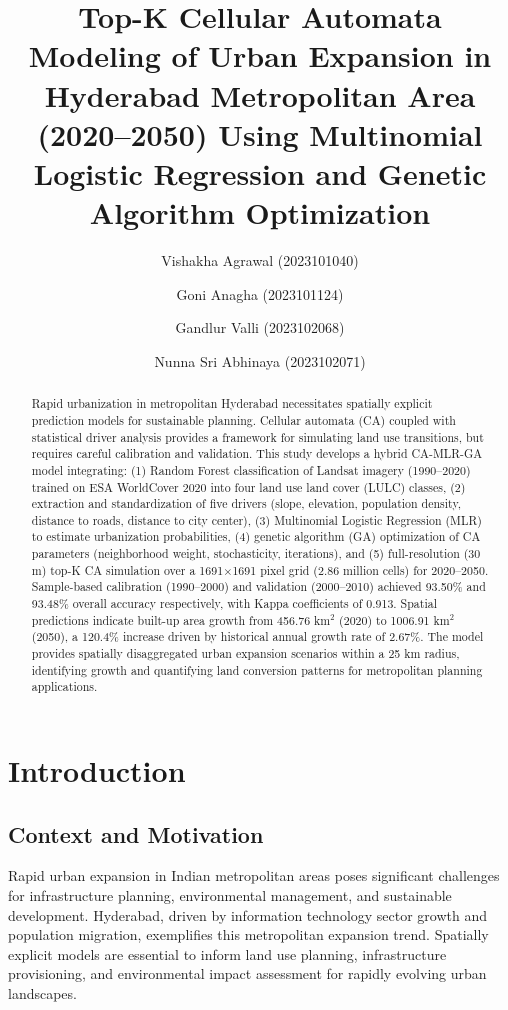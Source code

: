 \documentclass[12pt,a4paper]{article}
\begin{document}
\title{Top-K Cellular Automata Modeling of Urban Expansion in Hyderabad Metropolitan Area (2020--2050) Using Multinomial Logistic Regression and Genetic Algorithm Optimization}

\author{
Vishakha Agrawal (2023101040) \and
Goni Anagha (2023101124) \and
Gandlur Valli (2023102068) \and
Nunna Sri Abhinaya (2023102071)
}
\date{}

\maketitle

\begin{abstract}
Rapid urbanization in metropolitan Hyderabad necessitates spatially explicit prediction models for sustainable planning. Cellular automata (CA) coupled with statistical driver analysis provides a framework for simulating land use transitions, but requires careful calibration and validation. This study develops a hybrid CA-MLR-GA model integrating: (1) Random Forest classification of Landsat imagery (1990--2020) trained on ESA WorldCover 2020 into four land use land cover (LULC) classes, (2) extraction and standardization of five drivers (slope, elevation, population density, distance to roads, distance to city center), (3) Multinomial Logistic Regression (MLR) to estimate urbanization probabilities, (4) genetic algorithm (GA) optimization of CA parameters (neighborhood weight, stochasticity, iterations), and (5) full-resolution (30 m) top-K CA simulation over a 1691$\times$1691 pixel grid (2.86 million cells) for 2020--2050. Sample-based calibration (1990--2000) and validation (2000--2010) achieved 93.50\% and 93.48\% overall accuracy respectively, with Kappa coefficients of 0.913. Spatial predictions indicate built-up area growth from 456.76 km$^2$ (2020) to 1006.91 km$^2$ (2050), a 120.4\% increase driven by historical annual growth rate of 2.67\%. The model provides spatially disaggregated urban expansion scenarios within a 25 km radius, identifying growth and quantifying land conversion patterns for metropolitan planning applications.
\end{abstract}


\section{Introduction}

\subsection{Context and Motivation}
Rapid urban expansion in Indian metropolitan areas poses significant challenges for infrastructure planning, environmental management, and sustainable development. Hyderabad, driven by information technology sector growth and population migration, exemplifies this metropolitan expansion trend. Spatially explicit models are essential to inform land use planning, infrastructure provisioning, and environmental impact assessment for rapidly evolving urban landscapes.
\end{document}

